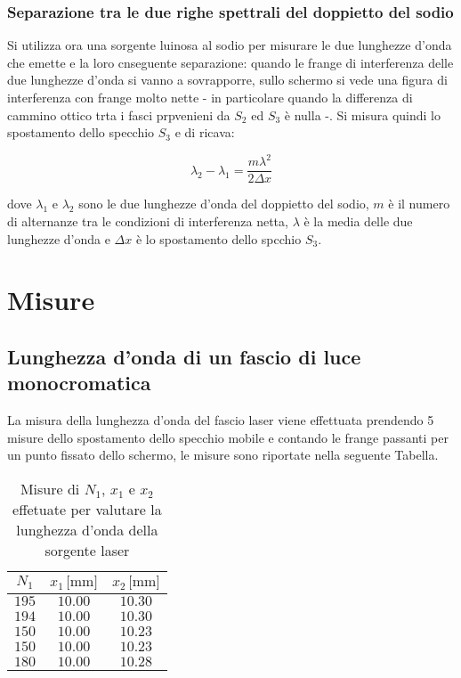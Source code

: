 \documentclass[]{article}
\let\oldsection\section%
\renewcommand{\section}{%
	\renewcommand{\theequation}{\thesection.\arabic{equation}}%
	\oldsection}%
\let\oldsubsection\subsection%
\renewcommand{\subsection}{%
	\renewcommand{\theequation}{\thesubsection.\arabic{equation}}%
	\oldsubsection}%
\begin{document}
\subsubsection{Separazione tra le due righe spettrali del doppietto del sodio}

Si utilizza ora una sorgente luinosa al sodio per misurare le due lunghezze d'onda che emette e la loro cnseguente separazione: quando le frange di interferenza delle due lunghezze d'onda si vanno a sovrapporre, sullo schermo si vede una figura di interferenza con frange molto nette - in particolare quando la differenza di cammino ottico trta i fasci prpvenieni da $S_2$ ed $S_3$ è nulla -. 
Si misura quindi lo spostamento dello specchio $S_3$ e di ricava:

\begin{equation}
    \label{Delta_lambda}
    \lambda _2 - \lambda _1 = \frac {m \lambda ^2 }{2 \Delta x}
\end{equation}

dove $\lambda _1$ e $\lambda _2$ sono le due lunghezze d'onda del doppietto del sodio, $m$ è il numero di alternanze tra le condizioni di interferenza netta, $\lambda$ è la media delle due lunghezze d'onda e $\Delta x$ è lo spostamento dello spcchio $S_3$.

\section{Misure}

\subsection {Lunghezza d'onda di un fascio di luce monocromatica}

La misura della lunghezza d'onda del fascio laser viene effettuata prendendo 5 misure dello spostamento dello specchio mobile e contando le frange passanti per un punto fissato dello schermo, le misure sono riportate nella seguente Tabella.

\begin{table}[H]
    \centering

    \begin{tabular}{||c|c|c||}
        \hline
        $N_1 $ & $x_1 \, \text{[mm]}$ & $x_2\, \text{[mm]}$ \\
        \hline\hline

        $195$ & $10.00$ & $10.30$ \\\hline
        $194$ & $10.00$ & $10.30$ \\\hline
        $150$ & $10.00$ & $10.23$ \\\hline
        $150$ & $10.00$ & $10.23$ \\\hline
        $180$ & $10.00$ & $10.28$ \\\hline
    
    \end{tabular}
    \caption{Misure di $N_1$, $x_1$ e $x_2$ effetuate per valutare la lunghezza d'onda della sorgente laser}
    \label{lambda}    
\end{table}
\end{document}
